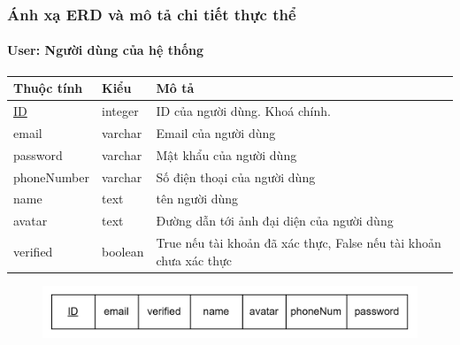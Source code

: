 \subsubsection{Ánh xạ ERD và mô tả chi tiết thực thể}
\paragraph{User: Người dùng của hệ thống}
\begin{center}
\begin{tabular}{|p{3cm} |p{2cm} |p{9cm}|}
 \hline
    Thuộc tính & Kiểu & Mô tả \\ [0.5ex] 
 \hline
 \underline{ID} & integer & ID của người dùng. Khoá chính. \\ 
 \hline
 email & varchar & Email của người dùng \\
 \hline
 password & varchar & Mật khẩu của người dùng \\
 \hline
 phoneNumber & varchar & Số điện thoại của người dùng \\
 \hline
 name & text & tên người dùng \\ [1ex] 
 \hline
 avatar & text & Đường dẫn tới ảnh đại diện của người dùng \\
 \hline
 verified & boolean & True nếu tài khoản đã xác thực, False nếu tài khoản chưa xác thực \\
 \hline
\end{tabular}
\end{center}
\begin{figure}[h]
        \centering
        \includegraphics[width=\textwidth]{Content//Phân tích và thiết kế hệ thống//images//ERD_mapping/user_mapping.png}
        \label{fig:enter-label}
\end{figure}
